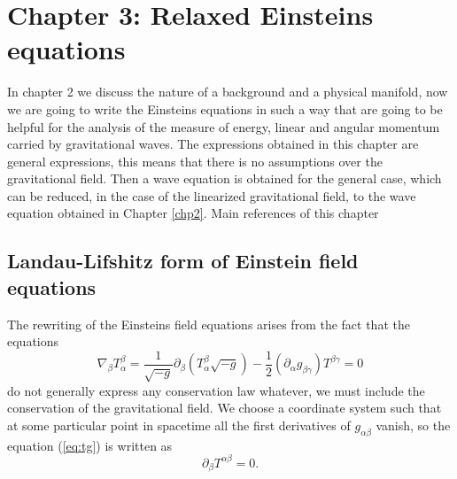 \chapter{Chapter 3: Relaxed Einsteins equations \label{chp3}}

In chapter 2 we discuss the nature of a background and a physical
manifold, now we are going to write the Einsteins equations in such
a way that are going to be helpful for the analysis of the measure
of energy, linear and angular momentum carried by gravitational waves. The expressions obtained in this chapter are general expressions, this means that there is no assumptions over the gravitational field. Then a wave equation is obtained for the general case, which can be reduced, in the case of the linearized gravitational field, to the wave equation obtained in Chapter \ref{chp2}. Main references of this chapter \cite{LANDAU,POISSON,DEWITT,THORNE-MP}

\section{Landau-Lifshitz form of Einstein field equations}

The rewriting of the Einsteins field equations arises from the fact
that the equations
\begin{equation}
\nabla_{\beta}T_{\alpha}^{\beta}=\frac{1}{\sqrt{-g}}\partial_{\beta}\left(T_{\alpha}^{\beta}\sqrt{-g}\right)-\frac{1}{2}\left(\partial_{\alpha}g_{\beta\gamma}\right)T^{\beta\gamma}=0\label{eq:tg}
\end{equation}
do not generally express any conservation law whatever, we must include
the conservation of the gravitational field. We choose a coordinate
system such that at some particular point in spacetime all the first
derivatives of $g_{\alpha\beta}$ vanish, so the equation (\ref{eq:tg})
is written as
\[
\partial_{\beta}T^{\alpha\beta}=0.
\]

